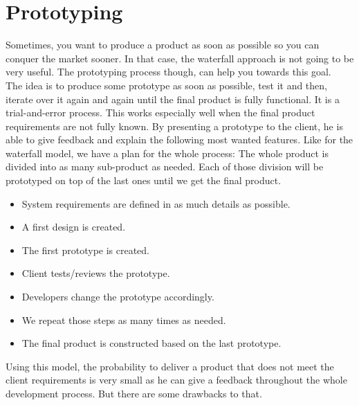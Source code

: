 \documentclass[12pt]{article}
\theoremstyle{definition}
\theoremstyle{definition}
\theoremstyle{remark}
\begin{document}

\section{Prototyping}


Sometimes, you want to produce a product as soon as possible so you can conquer the market sooner. In that case, the waterfall approach is not going to be very useful. The prototyping process though, can help you towards this goal.~\cite{Software_prototyping:2018}\\

The idea is to produce some prototype as soon as possible, test it and then, iterate over it again and again until the final product is fully functional. It is a trial-and-error process. This works especially well when the final product requirements are not fully known. By presenting a prototype to the client, he is able to give feedback and explain the following most wanted features. Like for the waterfall model, we have a plan for the whole process: The whole product is divided into as many sub-product as needed. Each of those division will be prototyped on top of the last ones until we get the final product.\\

\begin{itemize}

\item System requirements are defined in as much details as possible.
\item A first design is created.
\item The first prototype is created.
\item Client tests/reviews the prototype.
\item Developers change the prototype accordingly.
\item We repeat those steps as many times as needed.
\item The final product is constructed based on the last prototype.

\end{itemize}

Using this model, the probability to deliver a product that does not meet the client requirements is very small as he can give a feedback throughout the whole development process. But there are some drawbacks to that.\\
\end{document}

